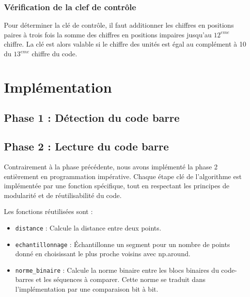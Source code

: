 \documentclass{rapport}
\begin{document}
\subsubsection*{Vérification de la clef de contrôle}
Pour déterminer la clé de contrôle, il faut additionner les chiffres en positions paires à trois fois la somme des
chiffres en positions impaires jusqu'au $12^{eme}$ chiffre. 
La clé est alors valable si le chiffre des unités est égal au complément à 10 du $13^{eme}$ chiffre du code.

\section{Implémentation}

\subsection{Phase 1 : Détection du code barre}

\subsection{Phase 2 : Lecture du code barre}

Contrairement à la phase précédente, nous avons implémenté la phase 2 entièrement en programmation impérative.
Chaque étape clé de l'algorithme est implémentée par une fonction spécifique, tout en respectant les principes de modularité et de réutilisabilité du code.

\vspace{0.5cm}

Les fonctions réutilisées sont : 
\begin{itemize}
	\item \texttt{distance} : Calcule la distance entre deux points.
	\item \texttt{echantillonnage} : Échantillonne un segment pour un nombre de points donné en choisissant le plus proche voisins avec np.around.
	\item \texttt{norme\_binaire} : Calcule la norme binaire entre les blocs binaires du code-barres et les séquences à comparer. Cette norme se traduit dans l'implémentation par une comparaison bit à bit.
\end{itemize}

\vspace{0.5cm}
\end{document}
